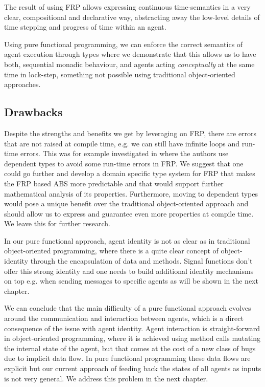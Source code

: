 The result of using FRP allows expressing continuous time-semantics in a very clear, compositional and declarative way, abstracting away the low-level details of time stepping and progress of time within an agent.

Using pure functional programming, we can enforce the correct semantics of agent execution through types where we demonstrate that this allows us to have both, sequential monadic behaviour, and agents acting \textit{conceptually} at the same time in lock-step, something not possible using traditional object-oriented approaches.

\subsection{Drawbacks}
Despite the strengths and benefits we get by leveraging on FRP, there are errors that are not raised at compile time, e.g. we can still have infinite loops and run-time errors. This was for example investigated in \cite{sculthorpe_safe_2009} where the authors use dependent types to avoid some run-time errors in FRP. We suggest that one could go further and develop a domain specific type system for FRP that makes the FRP based ABS more predictable and that would support further mathematical analysis of its properties. Furthermore, moving to dependent types would pose a unique benefit over the traditional object-oriented approach and should allow us to express and guarantee even more properties at compile time. We leave this for further research.

In our pure functional approach, agent identity is not as clear as in traditional object-oriented programming, where there is a quite clear concept of object-identity through the encapsulation of data and methods. Signal functions don't offer this strong identity and one needs to build additional identity mechanisms on top e.g. when sending messages to specific agents as will be shown in the next chapter.

We can conclude that the main difficulty of a pure functional approach evolves around the communication and interaction between agents, which is a direct consequence of the issue with agent identity. Agent interaction is straight-forward in object-oriented programming, where it is achieved using method calls mutating the internal state of the agent, but that comes at the cost of a new class of bugs due to implicit data flow. In pure functional programming these data flows are explicit but our current approach of feeding back the states of all agents as inputs is not very general. We address this problem in the next chapter.

